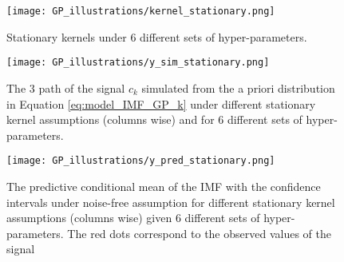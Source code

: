 \begin{figure}[H]
\centering
\texttt{[image: GP\_illustrations/kernel\_stationary.png]}
\caption{Stationary kernels under 6 different sets of hyper-parameters.}\label{fig:}
\end{figure}

\begin{figure}[H]
\centering
\texttt{[image: GP\_illustrations/y\_sim\_stationary.png]}
\caption{The 3 path of the signal $c_k$ simulated from the a priori distribution in Equation \eqref{eq:model_IMF_GP_k} under different stationary kernel assumptions (columns wise) and for 6 different sets of hyper-parameters.}\label{fig:}
\end{figure}

\begin{figure}[H]
\centering
\texttt{[image: GP\_illustrations/y\_pred\_stationary.png]}
\caption{The predictive conditional mean of the IMF with the confidence intervals  under  noise-free assumption for different stationary kernel assumptions (columns wise) given 6 different sets of hyper-parameters. The red dots correspond to the observed values of the signal}\label{fig:}
\end{figure}